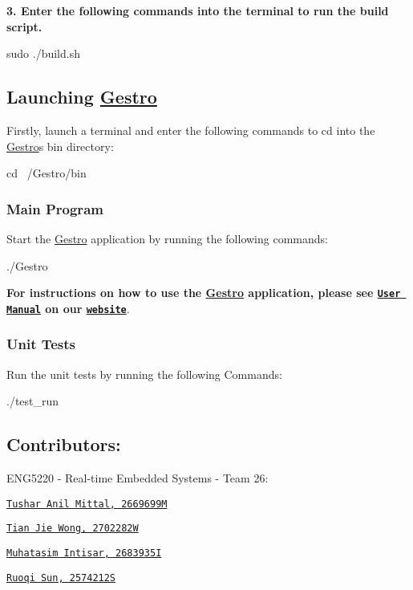 {\bfseries 3. Enter the following commands into the terminal to run the build script.} 
\begin{DoxyCode}
sudo ./build.sh
\end{DoxyCode}


\subsection*{Launching \hyperlink{namespace_gestro}{Gestro}}

Firstly, launch a terminal and enter the following commands to cd into the \hyperlink{namespace_gestro}{Gestro}\textquotesingle{}s bin directory\+: 
\begin{DoxyCode}
cd ~/Gestro/bin
\end{DoxyCode}


\subsubsection*{Main Program}

Start the \hyperlink{namespace_gestro}{Gestro} application by running the following commands\+:


\begin{DoxyCode}
./Gestro
\end{DoxyCode}
 {\bfseries For instructions on how to use the \hyperlink{namespace_gestro}{Gestro} application, please see \href{https://randomguy-coder.github.io/Gestro/user_manual.html}{\tt User Manual} on our \href{https://randomguy-coder.github.io/Gestro/}{\tt website}}.

\subsubsection*{Unit Tests}

Run the unit tests by running the following Commands\+: 
\begin{DoxyCode}
./test\_run
\end{DoxyCode}


\subsection*{Contributors\+:}

E\+N\+G5220 -\/ Real-\/time Embedded Systems -\/ Team 26\+:
\begin{DoxyItemize}
\item \href{https://github.com/RandomGuy-coder}{\tt Tushar Anil Mittal, 2669699M}
\item \href{https://github.com/terrsoshi}{\tt Tian Jie Wong, 2702282W}
\item \href{https://github.com/MuhatasimIntisar}{\tt Muhatasim Intisar, 2683935I}
\item \href{https://github.com/David2574}{\tt Ruoqi Sun, 2574212S}
\end{DoxyItemize}

